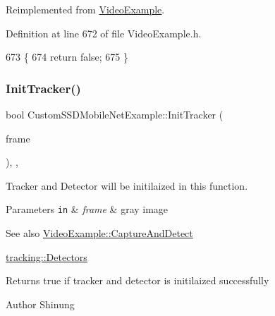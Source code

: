 Reimplemented from \mbox{\hyperlink{class_video_example_af8ea44f17711129d2b954d1f01fee1f0}{Video\+Example}}.



Definition at line 672 of file Video\+Example.\+h.


\begin{DoxyCode}
673     \{
674         \textcolor{keywordflow}{return} \textcolor{keyword}{false};
675     \}
\end{DoxyCode}
\mbox{\label{class_custom_s_s_d_mobile_net_example_a5d5c5184860ac247bd2f562d6678e5e2}} 
\subsubsection{\texorpdfstring{Init\+Tracker()}{InitTracker()}}
{\footnotesize\ttfamily bool Custom\+S\+S\+D\+Mobile\+Net\+Example\+::\+Init\+Tracker (\begin{DoxyParamCaption}\item[{cv\+::\+U\+Mat}]{frame }\end{DoxyParamCaption})\hspace{0.3cm}{\ttfamily [inline]}, {\ttfamily [protected]}, {\ttfamily [virtual]}}



Tracker and Detector will be initilaized in this function. 


\begin{DoxyParams}[1]{Parameters}
\mbox{\tt in}  & {\em frame} & gray image \\
\hline
\end{DoxyParams}
\begin{DoxySeeAlso}{See also}
\mbox{\hyperlink{class_video_example_ace8617201da40b6e230bd6c049b48aa0}{Video\+Example\+::\+Capture\+And\+Detect}} 

\mbox{\hyperlink{namespacetracking_a1edf574df68abf048988b7cbacc52760}{tracking\+::\+Detectors}} 
\end{DoxySeeAlso}
\begin{DoxyReturn}{Returns}
true if tracker and detector is initilaized successfully 
\end{DoxyReturn}
\begin{DoxyAuthor}{Author}
Shinung 
\end{DoxyAuthor}


